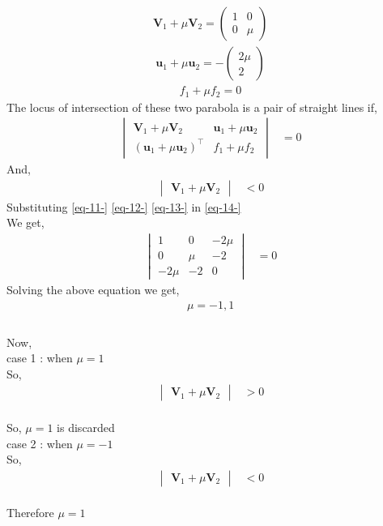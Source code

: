 \documentclass[journal,12pt,twocolumn]{IEEEtran}
\newcommand{\myvec}[1]{\ensuremath{\begin{pmatrix}#1\end{pmatrix}}}
\let\vec\mathbf
\let\vec\mathbf
\newcommand{\mydet}[1]{\ensuremath{\begin{vmatrix}#1\end{vmatrix}}}
\providecommand{\brak}[1]{\ensuremath{\left(#1\right)}}
\begin{document}
\begin{align}
\vec{V}_1+\mu\vec{V}_2= \myvec{
1 & 0\\
0 & \mu
}
\label{eq-11-}  
\end{align}
\begin{align}
\vec{u}_1+\mu\vec{u}_2= -\myvec{
2 \mu\\
2
}
\label{eq-12-}  
\end{align}
\begin{align}
f_1+\mu f_2= 0
\label{eq-13-}  
\end{align}
The locus of intersection of these two parabola is a pair of straight lines  if, \\ 
\begin{align}
\mydet{\vec{V}_1 + \mu\vec{V}_2 & \vec{u}_1+\mu \vec{u}_2\\ \brak{\vec{u}_1+\mu \vec{u}_2}^{\top} & f_1 + \mu f_2} &= 0
\label{eq-14-}  
\end{align}
And,\\
\begin{align}
\mydet{\vec{V}_1 + \mu\vec{V}_2} & < 0
\end{align}
Substituting \eqref{eq-11-} \eqref{eq-12-} \eqref{eq-13-} in \eqref{eq-14-}\\
We get,\\ 
\begin{align}
\mydet{1& 0 & -2 \mu\\ 
0 & \mu & -2 \\
-2 \mu & -2 & 0
} &= 0
\end{align}
Solving the above equation we get,\\ 
\begin{align}
    \mu = -1 ,1
\\
\end{align}
\\
Now,\\
case 1 : when $\mu = 1$\\
So,\\
\begin{align}
\mydet{\vec{V}_1 + \mu\vec{V}_2} & > 0
\end{align}
\\
So, $\mu =1 $ is discarded\\
case 2 : when $\mu = -1$\\
So,\\
\begin{align}
\mydet{\vec{V}_1 + \mu\vec{V}_2} & < 0
\end{align}
\\
Therefore $\mu = 1$\\
\end{document}
